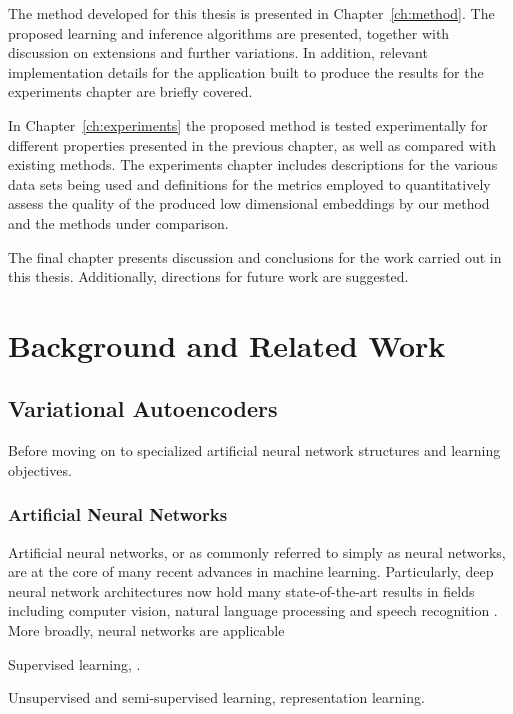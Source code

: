 The method developed for this thesis is presented in Chapter~\ref{ch:method}. The proposed learning and inference algorithms are presented, together with discussion on extensions and further variations. In addition, relevant implementation details for the application built to produce the results for the experiments chapter are briefly covered.

In Chapter~\ref{ch:experiments} the proposed method is tested experimentally for different properties presented in the previous chapter, as well as compared with existing methods. The experiments chapter includes descriptions for the various data sets being used and definitions for the metrics employed to quantitatively assess the quality of the produced low dimensional embeddings by our method and the methods under comparison.

The final chapter presents discussion and conclusions for the work carried out in this thesis. Additionally, directions for future work are suggested.

\chapter{Background and Related Work}
\label{ch:background_and_related_work}

\section{Variational Autoencoders}
\label{section:variational_autoencoders}

Before moving on to specialized artificial neural network structures and learning objectives.

\subsection{Artificial Neural Networks}
\label{section:artificial_neural_networks}

Artificial neural networks, or as commonly referred to simply as neural networks, are at the core of many recent advances in machine learning. Particularly, deep neural network architectures now hold many state-of-the-art results in fields including computer vision, natural language processing and speech recognition \cite{deep_learning}. More broadly, neural networks are applicable 

Supervised learning, \cite{imagenet}.

Unsupervised and semi-supervised learning, representation learning.

